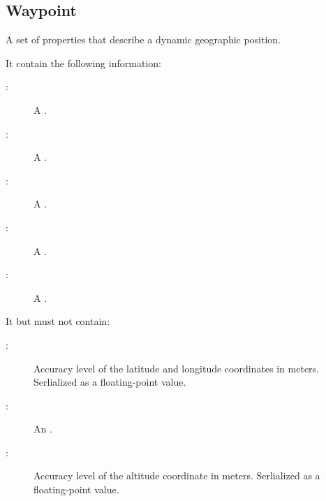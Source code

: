 \documentclass[letterpaper,10pt,english]{sphinxmanual}
\begin{document}
\subsection{Waypoint}
\label{\detokenize{taxonomy_serialization:waypoint}}\label{\detokenize{taxonomy_serialization:id8}}
A set of properties that describe a dynamic geographic position.

It  contain the following information:
\begin{description}
\item[{:}] \leavevmode
A {\hyperref[\detokenize{taxonomy_serialization:latitude}]{}}.

\item[{:}] \leavevmode
A {\hyperref[\detokenize{taxonomy_serialization:longitude}]{}}.

\item[{:}] \leavevmode
A {\hyperref[\detokenize{taxonomy_serialization:moment}]{}}.

\item[{:}] \leavevmode
A {\hyperref[\detokenize{taxonomy_serialization:heading}]{}}.

\item[{:}] \leavevmode
A {\hyperref[\detokenize{taxonomy_serialization:speed}]{}}.

\end{description}

It  but must not contain:
\begin{description}
\item[{:}] \leavevmode
Accuracy level of the latitude and longitude coordinates in meters.
Serlialized as a floating-point value.

\item[{:}] \leavevmode
An {\hyperref[\detokenize{taxonomy_serialization:altitude}]{}}.

\item[{:}] \leavevmode
Accuracy level of the altitude coordinate in meters.
Serlialized as a floating-point value.

\end{description}
\end{document}
